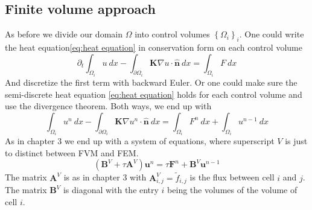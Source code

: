 \documentclass[../Main/main.tex]{subfiles}
\begin{document}
	\subsection*{Finite volume approach}
	As before we divide our domain $\Omega$ into control volumes $\left \{ \Omega_i \right \}_i$. One could write the heat equation\eqref{eq:heat equation} in conservation form on each control volume
	\begin{equation}
		\partial_t\int_{\Omega_i}u \ dx -\int_{\partial \Omega_i} \pmb{K}\nabla u \cdot \hat{\pmb{n}}\ dx = \int_{\Omega_i} F \ dx
	\end{equation}
	And discretize the first term with backward Euler. Or one could make sure the semi-discrete heat equation \eqref{eq:heat equation} holds for each control volume and use the divergence theorem. Both ways, we end up with
	\begin{equation}
		\int_{\Omega_i} u^n \ dx - \int_{\partial \Omega_i} \pmb{K}\nabla u^n \cdot \hat{\pmb{n}}\ dx = \int_{\Omega_i} F^n \ dx + \int_{\Omega_i} u^{n-1} \ dx
	\end{equation}
	As in chapter 3 we end up with a system of equations, where superscript $V$ is just to distinct between FVM and FEM.
	\begin{equation}\label{eq:heat fvm disc}
		(\pmb{B}^V + \tau \pmb{A}^V)\pmb{u}^n = \tau\pmb{F}^n + \pmb{B}^V\pmb{u}^{n-1}
	\end{equation}
	The matrix $\pmb{A}^V$ is as in chapter 3 with $\pmb{A}^V_{i,j}= \tilde{f}_{i,j}$ is the flux between cell $i$ and $j$. The matrix $\pmb{B}^V$ is diagonal with the entry $i$ being the volumes of the volume of cell $i$.
\end{document}

